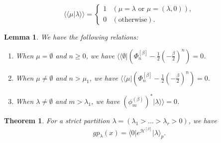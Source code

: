 \documentclass[10pt,a4paper]{amsart}
\newtheorem{lemma}{Lemma}
\newtheorem{thm}{Theorem}
\def\bbra#1{\langle\!\langle #1 \vert}
\def\bra#1{\langle #1 \vert}
\def\iinner#1#2{\langle\!\langle #1|#2\rangle\!\rangle}
\def\ket#1{\vert #1 \rangle}
\def\kket#1{\vert #1 \rangle\!\rangle}
\begin{document}
\begin{equation}\label{eq:mokuhyou}
\iinner{\mu}{\lambda}=
\begin{cases}
1 & (\mu=\lambda \text{ or } \mu=(\lambda,0)),\\
0 & (\text{otherwise}).
\end{cases}
\end{equation}

\begin{lemma}\label{lemma:hojyo2}
We have the following relations:
\begin{enumerate}
\item[(A).] When $\mu=\emptyset$ and $n\geq 0$, we have $\bbra{\emptyset}(\Phi^{[\beta]}_n-\tfrac{1}{2}(-\tfrac{\beta}{2})^{n})=0$.
\item[(B).] When $\mu\neq \emptyset$ and $n> \mu_1$, we have $\bbra{\mu}(\Phi^{[\beta]}_n-\tfrac{1}{2}(-\tfrac{\beta}{2})^{n})=0$.
\item[(C).] When $\lambda\neq \emptyset$ and $m>\lambda_1$, we have $(\phi^{(\beta)}_m)^\ast \kket{\lambda}=0$.
\end{enumerate}
\end{lemma}

\begin{thm}\label{thm:fermion_of_gp}
For a strict partition $\lambda=(\lambda_1>\dots>\lambda_r>0)$, we have
\begin{equation}\label{eq:def_of_gp}
\begin{aligned}
gp_\lambda(x)=\bra{0}e^{\mathcal{H}^{[\beta]}}\ket{\lambda}_p.
\end{aligned}
\end{equation}
\end{thm}
\end{document}
